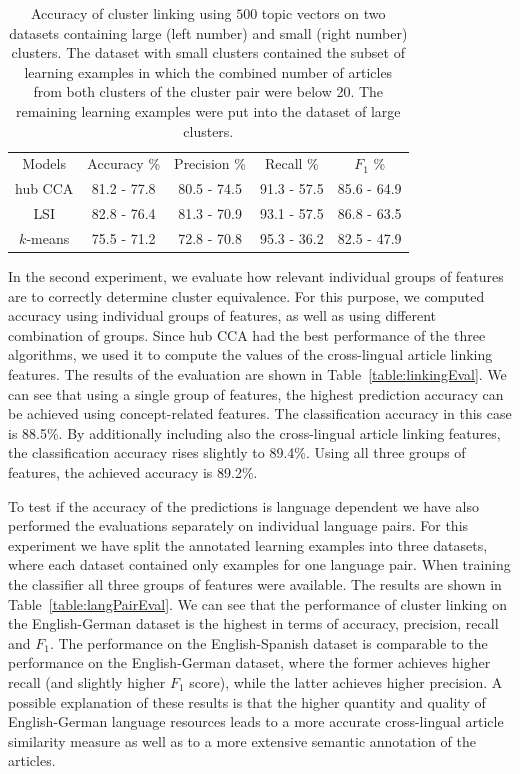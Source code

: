 \documentclass[twoside,11pt]{article}
\begin{document}
\begin{table}[h]
\caption{Accuracy of cluster linking using $500$ topic vectors on two datasets containing large (left number) and small (right number) clusters. The dataset with small clusters contained the subset of learning examples in which the combined number of articles from both clusters of the cluster pair were below 20. The remaining learning examples were put into the dataset of large clusters.}
\label{table:linkingEvalAlgosLargeSmall}
\begin{center}
\begin{tabular}{|c|c|c|c|c|}
  \hline
  \cline{1-5}
  Models & Accuracy \% & Precision \% & Recall \% & $F_1$ \% \\ \cline{1-5}
  hub CCA  & 81.2 - 77.8 & 80.5 - 74.5 & 91.3 - 57.5 & 85.6 - 64.9 \\ \cline{1-5}
  LSI      & 82.8 - 76.4 & 81.3 - 70.9 & 93.1 - 57.5 & 86.8 - 63.5 \\ \cline{1-5}
 $k$-means & 75.5 - 71.2 & 72.8 - 70.8 & 95.3 - 36.2 & 82.5 - 47.9 \\ \cline{1-5}
\end{tabular}
\end{center}
\end{table}

In the second experiment, we evaluate how relevant individual groups of features are to correctly determine cluster equivalence. For this purpose, we computed accuracy using individual groups of features, as well as using different combination of groups. Since hub CCA had the best  performance of the three algorithms, we used it to compute the values of the cross-lingual article linking features. The results of the evaluation are shown in Table~\ref{table:linkingEval}. We can see that using a single group of features, the highest prediction accuracy can be achieved using  concept-related features. The classification accuracy in this case is 88.5\%. By additionally including also the cross-lingual article linking features, the classification accuracy rises slightly to 89.4\%. Using all three groups of features, the achieved accuracy is 89.2\%.

To test if the accuracy of the predictions is language dependent we have also performed the evaluations separately on individual language pairs. For this experiment we have split the annotated learning examples into three datasets, where each dataset contained only examples for one language pair. When training the classifier all three groups of features were available. The results are shown in Table~\ref{table:langPairEval}. We can see that the performance of cluster linking on the English-German dataset is the highest in terms of accuracy, precision, recall and $F_1$. The performance on the English-Spanish dataset is comparable to the performance on the English-German dataset, where the former achieves higher recall (and slightly higher $F_1$ score), while the latter achieves higher precision. A possible explanation of these results is that the higher quantity and quality of English-German language resources leads to a more accurate cross-lingual article similarity measure as well as to a more extensive semantic annotation of the articles.
\end{document}
